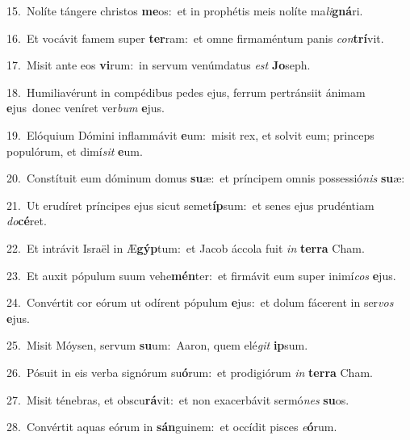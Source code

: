 {\numbfont\textcolor{\numbcolor}{15.}}~Nolíte tángere christos \textbf{me}\-os:~\star et in prophétis meis nolíte ma\-\textit{li}\-\textbf{gná}ri.\par
{\numbfont\textcolor{\numbcolor}{16.}}~Et vocávit famem super \textbf{ter}\-ram:~\star et omne firmaméntum panis \textit{con}\-\textbf{trí}vit.\par
{\numbfont\textcolor{\numbcolor}{17.}}~Misit ante eos \textbf{vi}\-rum:~\star in servum venúmdatus \textit{est} \textbf{Jo}\-seph.\par
{\numbfont\textcolor{\numbcolor}{18.}}~Humiliavérunt in compédibus pedes ejus, ferrum pertránsiit ánimam \textbf{e}\-jus~\star donec veníret ver\textit{bum} \textbf{e}\-jus.\par
{\numbfont\textcolor{\numbcolor}{19.}}~Elóquium Dómini inflammávit \textbf{e}\-um:~\star misit rex, et solvit eum; princeps populórum, et dimí\textit{sit} \textbf{e}\-um.\par
{\numbfont\textcolor{\numbcolor}{20.}}~Constítuit eum dóminum domus \textbf{su}\-æ:~\star et príncipem omnis possessió\textit{nis} \textbf{su}\-æ:\par
{\numbfont\textcolor{\numbcolor}{21.}}~Ut erudíret príncipes ejus sicut semet\-\textbf{íp}\-sum:~\star et senes ejus prudéntiam \textit{do}\-\textbf{cé}ret.\par
{\numbfont\textcolor{\numbcolor}{22.}}~Et intrávit Israël in Æ\-\textbf{gýp}\-tum:~\star et Jacob áccola fuit \textit{in} \textbf{ter}\-\textbf{ra} Cham.\par
{\numbfont\textcolor{\numbcolor}{23.}}~Et auxit pópulum suum vehe\-\textbf{mén}\-ter:~\star et firmávit eum super inimí\textit{cos} \textbf{e}\-jus.\par
{\numbfont\textcolor{\numbcolor}{24.}}~Convértit cor eórum ut odírent pópulum \textbf{e}\-jus:~\star et dolum fácerent in ser\textit{vos} \textbf{e}\-jus.\par
{\numbfont\textcolor{\numbcolor}{25.}}~Misit Móysen, servum \textbf{su}\-um:~\star Aaron, quem elé\textit{git} \textbf{ip}\-sum.\par
{\numbfont\textcolor{\numbcolor}{26.}}~Pósuit in eis verba signórum su\-\textbf{ó}\-rum:~\star et prodigiórum \textit{in} \textbf{ter}\-\textbf{ra} Cham.\par
{\numbfont\textcolor{\numbcolor}{27.}}~Misit ténebras, et obscu\-\textbf{rá}\-vit:~\star et non exacerbávit sermó\textit{nes} \textbf{su}\-os.\par
{\numbfont\textcolor{\numbcolor}{28.}}~Convértit aquas eórum in \textbf{sán}\-guinem:~\star et occídit pisces \textit{e}\-\textbf{ó}rum.\par
